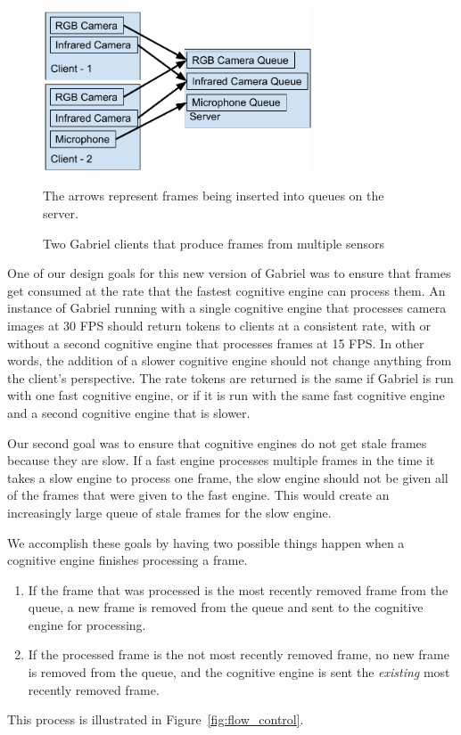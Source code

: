 \begin{figure}[h!]
  \includegraphics[width=8cm]{figures/queues.pdf}
  \begin{captiontext}
    The arrows represent frames being inserted into queues on the server.
  \end{captiontext}
  \caption{
    Two Gabriel clients that produce frames from multiple sensors
  }\label{fig:queues}
\end{figure}

One of our design goals for this new version of Gabriel was to ensure that
frames get consumed at the rate that the fastest cognitive engine can process
them.
An instance of Gabriel running with a single cognitive engine that processes
camera images at 30 FPS should return tokens to clients at a consistent rate,
with or without a second cognitive engine that processes frames at 15 FPS.
In other words, the addition of a slower cognitive engine should not change
anything from the client's perspective.
The rate tokens are returned is the same if Gabriel is run with one fast
cognitive engine, or if it is run with the same fast cognitive engine and a
second cognitive engine that is slower.

Our second goal was to ensure that cognitive engines do not get stale
frames because they are slow.
If a fast engine processes multiple frames in the time it takes a slow engine
to process one frame, the slow engine should not be given all of the frames
that were given to the fast engine.
This would create an increasingly large queue of stale frames for the slow
engine.

We accomplish these goals by having two possible things happen when a
cognitive engine finishes processing a frame.
\begin{enumerate}
\item If the frame that was processed is the most recently removed frame
  from the queue, a new frame is removed from the queue and sent to the
  cognitive engine for processing.
\item If the processed frame is the not most recently removed frame, no new
  frame is removed from the queue, and the cognitive engine is sent the
  \emph{existing} most recently removed frame.
\end{enumerate}
This process is illustrated in Figure~{\ref{fig:flow_control}}.

